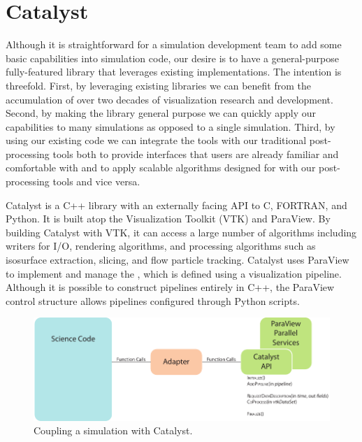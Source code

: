 \section{Catalyst}
\label{sec:Catalyst}

Although it is straightforward for a simulation development team to add some
basic \vda capabilities into simulation code, our desire is to have a
general-purpose fully-featured library that leverages existing
implementations.  The intention is threefold.  First, by leveraging existing
\vda libraries we can benefit from the accumulation of over two decades of
visualization research and development.  Second, by making the library
general purpose we can quickly apply our \insitu \vda capabilities to many
simulations as opposed to a single simulation.  Third, by using our
existing code we can integrate the \insitu tools with our traditional
post-processing tools both to provide interfaces that users are already
familiar and comfortable with and to apply scalable algorithms designed for
\insitu with our post-processing tools and vice versa.

Catalyst is a C++ library with an externally facing API to C, FORTRAN, and
Python.  It is built atop the Visualization Toolkit (VTK) and
ParaView.  By building Catalyst with VTK, it can access a
large number of algorithms including writers for I/O, rendering algorithms,
and processing algorithms such as isosurface extraction, slicing, and flow
particle tracking.  Catalyst uses ParaView to implement and manage the
\vda, which is defined using a visualization
pipeline.  Although it is possible to construct
pipelines entirely in C++, the ParaView control structure allows pipelines
configured through Python scripts.

\begin{figure}[htb]
  \centering
  \includegraphics{figures/CatalystCoupling}
  \caption{Coupling a simulation with Catalyst.}
  \label{fig:CatalystCoupling}
\end{figure}

